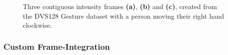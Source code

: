 \begin{figure}[htb]%
    \centering
    \qquad
    \qquad
    \caption{Three contiguous intensity frames \textbf{(a)}, \textbf{(b)} and \textbf{(c)}, created from the DVS128 Gesture dataset with a person moving their right hand clockwise.}%
    \label{fig:dvs128_integrated_frames}%
\end{figure}


\subsubsection{Custom Frame-Integration} \label{sssec:custom_frame_integration_implementation}

